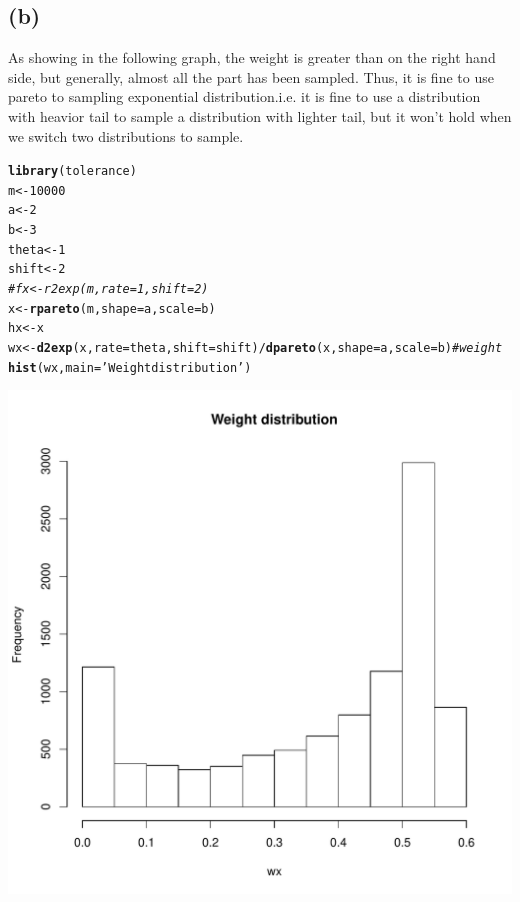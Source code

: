 \documentclass{article}\usepackage[]{graphicx}\usepackage[]{color}
\makeatletter
\def\maxwidth{ %
  \ifdim\Gin@nat@width>\linewidth
    \linewidth
  \else
    \Gin@nat@width
  \fi
}
\newcommand{\hlnum}[1]{\textcolor[rgb]{0.686,0.059,0.569}{#1}}%
\newcommand{\hlstr}[1]{\textcolor[rgb]{0.192,0.494,0.8}{#1}}%
\newcommand{\hlcom}[1]{\textcolor[rgb]{0.678,0.584,0.686}{\textit{#1}}}%
\newcommand{\hlopt}[1]{\textcolor[rgb]{0,0,0}{#1}}%
\newcommand{\hlstd}[1]{\textcolor[rgb]{0.345,0.345,0.345}{#1}}%
\newcommand{\hlkwb}[1]{\textcolor[rgb]{0.69,0.353,0.396}{#1}}%
\newcommand{\hlkwc}[1]{\textcolor[rgb]{0.333,0.667,0.333}{#1}}%
\newcommand{\hlkwd}[1]{\textcolor[rgb]{0.737,0.353,0.396}{\textbf{#1}}}%
\newenvironment{kframe}{%
 \def\at@end@of@kframe{}%
 \ifinner\ifhmode%
  \def\at@end@of@kframe{\end{minipage}}%
  \begin{minipage}{\columnwidth}%
 \fi\fi%
 \def\FrameCommand##1{\hskip\@totalleftmargin \hskip-\fboxsep
 \colorbox{shadecolor}{##1}\hskip-\fboxsep
     \hskip-\linewidth \hskip-\@totalleftmargin \hskip\columnwidth}%
 \MakeFramed {\advance\hsize-\width
   \@totalleftmargin\z@ \linewidth\hsize
   \@setminipage}}%
 {\par\unskip\endMakeFramed%
 \at@end@of@kframe}
\newenvironment{knitrout}{}{} %
\makeatother
\begin{document}
\subsection{(b)}
As showing in the following graph, the weight is greater than on the right hand side, but generally, almost all the part has been sampled. Thus, it is fine to use pareto to sampling exponential distribution.i.e. it is fine to use a distribution with heavior tail to sample a distribution with lighter tail, but it won't hold when we switch two distributions to sample.
\begin{knitrout}
\color{fgcolor}\begin{kframe}
\begin{alltt}
\hlkwd{library}\hlstd{(tolerance)}
\hlstd{m} \hlkwb{<-} \hlnum{10000}
\hlstd{a} \hlkwb{<-} \hlnum{2}
\hlstd{b} \hlkwb{<-} \hlnum{3}
\hlstd{theta} \hlkwb{<-} \hlnum{1}
\hlstd{shift} \hlkwb{<-} \hlnum{2}
\hlcom{#fx <- r2exp(m, rate = 1, shift = 2)}
\hlstd{x} \hlkwb{<-} \hlkwd{rpareto}\hlstd{(m,} \hlkwc{shape}\hlstd{=a,} \hlkwc{scale} \hlstd{= b)}
\hlstd{hx} \hlkwb{<-} \hlstd{x}
\hlstd{wx} \hlkwb{<-} \hlkwd{d2exp}\hlstd{(x,} \hlkwc{rate} \hlstd{= theta,} \hlkwc{shift} \hlstd{= shift)}\hlopt{/}\hlkwd{dpareto}\hlstd{(x,} \hlkwc{shape}\hlstd{=a,} \hlkwc{scale} \hlstd{= b)} \hlcom{#weight}
\hlkwd{hist}\hlstd{(wx,} \hlkwc{main}\hlstd{=}\hlstr{'Weight distribution'}\hlstd{)}
\end{alltt}
\end{kframe}
\includegraphics[width=\maxwidth]{figure/unnamed-chunk-2-1} 

\end{knitrout}
\end{document}
